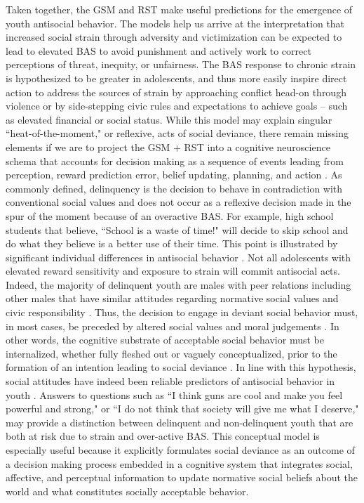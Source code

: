 \documentclass[utf8]{article}
\begin{document}
Taken together, the GSM and RST make useful predictions for the emergence of youth antisocial behavior. The models help us arrive at the interpretation that increased social strain through adversity and victimization can be expected to lead to elevated BAS to avoid punishment and actively work to correct perceptions of threat, inequity, or unfairness. The BAS response to chronic strain is hypothesized to be greater in adolescents, and thus more easily inspire direct action to address the sources of strain by approaching conflict head-on through violence or by side-stepping civic rules and expectations to achieve goals -- such as elevated financial or social status. While this model may explain singular  ``heat-of-the-moment," or reflexive, acts of social deviance, there remain missing elements if we are to project the GSM + RST into a cognitive neuroscience schema that accounts for decision making as a sequence of events leading from perception, reward prediction error, belief updating, planning, and action \citep{cosmides1997dissecting,cosmides2000socialreason,van2010interpersonal}. As commonly defined, delinquency is the decision to behave in contradiction with conventional social values and does not occur as a reflexive decision made in the spur of the moment because of an overactive BAS. For example, high school students that believe, ``School is a waste of time!" will decide to skip school and do what they believe is a better use of their time. This point is illustrated by significant individual differences in antisocial behavior \citep{mazerolle1998gender}. Not all adolescents with elevated reward sensitivity and exposure to strain will commit antisocial acts. Indeed, the majority of delinquent youth are males with peer relations including other males that have similar attitudes regarding normative social values and civic responsibility \citep{mears1998explaining}. Thus, the decision to engage in deviant social behavior must, in most cases, be preceded by altered social values and moral judgements \citep{stams2006moral}. In other words, the cognitive substrate of acceptable social behavior must be internalized, whether fully fleshed out or vaguely conceptualized, prior to the formation of an intention leading to social deviance \citep{pogarsky2018offender}. In line with this hypothesis, social attitudes have indeed been reliable predictors of antisocial behavior in youth \citep{tarry2007attitudes}. Answers to questions such as ``I think guns are cool and make you feel powerful and strong," or ``I do not think that society will give me what I deserve," may provide a distinction between delinquent and non-delinquent youth that are both at risk due to strain and over-active BAS. This conceptual model is especially useful because it explicitly formulates social deviance as an outcome of a decision making process embedded in a cognitive system that integrates social, affective, and perceptual information to update normative social beliefs about the world and what constitutes socially acceptable behavior.
\end{document}
